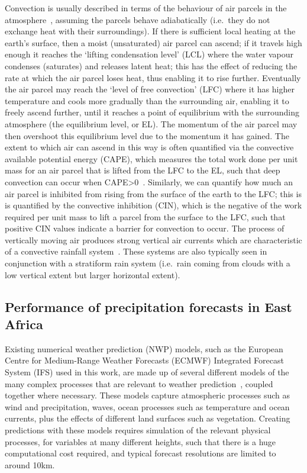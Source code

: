 \documentclass[../main.tex]{subfiles}
\begin{document}
Convection is usually described in terms of the behaviour of air parcels in the atmosphere~\citep{barry_atmosphere_2009}, assuming the parcels behave adiabatically (i.e.~they do not exchange heat with their surroundings). If there is sufficient local heating at the earth's surface, then a moist (unsaturated) air parcel can ascend; if it travels high enough it reaches the `lifting condensation level' (LCL) where the water vapour condenses (saturates) and releases latent heat; this has the effect of reducing the rate at which the air parcel loses heat, thus enabling it to rise further. Eventually the air parcel may reach the `level of free convection' (LFC) where it has higher temperature and cools more gradually than the surrounding air, enabling it to freely ascend further, until it reaches a point of equilibrium with the surrounding atmosphere (the equilibrium level, or EL). The momentum of the air parcel may then overshoot this equilibrium level due to the momentum it has gained. The extent to which air can ascend in this way is often quantified via the convective available potential energy (CAPE), which measures the total work done per unit mass for an air parcel that is lifted from the LFC to the EL, such that deep convection can occur when CAPE>0~\citep{stensrud_convective_2013}. Similarly, we can quantify how much an air parcel is inhibited from rising from the surface of the earth to the LFC; this is is quantified by the convective inhibition (CIN), which is the negative of the work required per unit mass to lift a parcel from the surface to the LFC, such that positive CIN values indicate a barrier for convection to occur. The process of vertically moving air produces strong vertical air currents which are characteristic of a convective rainfall system~\citep{houze_jr_mesoscale_2004}. These systems are also typically seen in conjunction with a stratiform rain system (i.e.~rain coming from clouds with a low vertical extent but larger horizontal extent). 

\subsection{Performance of precipitation forecasts in East Africa}

Existing numerical weather prediction (NWP) models, such as the European Centre for Medium-Range Weather Forecasts (ECMWF) Integrated Forecast System (IFS) used in this work, are made up of several different models of the many complex processes that are relevant to weather prediction~\citep{ecmwf_section_2023}, coupled together where necessary. These models capture atmospheric processes such as wind and precipitation, waves, ocean processes such as temperature and ocean currents, plus the effects of different land surfaces such as vegetation. Creating predictions with these models requires simulation of the relevant physical processes, for variables at many different heights, such that there is a huge computational cost required, and typical forecast resolutions are limited to around 10km.
\end{document}
